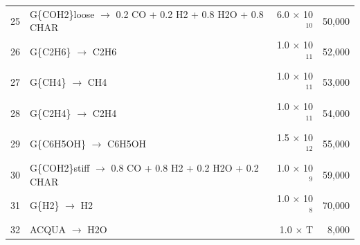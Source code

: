 \documentclass[12pt,titlepage]{article}
\begin{document}
\begin{center}
\begin{longtable}{cp{4in}rr}
    25 & G\{COH2\}loose $\rightarrow$ 0.2 CO + 0.2 H2 + 0.8 H2O + 0.8 CHAR & 6.0 $\times$ 10$^{10}$ & 50,000 \\
    26 & G\{C2H6\} $\rightarrow$ C2H6 & 1.0 $\times$ 10$^{11}$ & 52,000 \\
    27 & G\{CH4\} $\rightarrow$ CH4 & 1.0 $\times$ 10$^{11}$ & 53,000 \\
    28 & G\{C2H4\} $\rightarrow$ C2H4 & 1.0 $\times$ 10$^{11}$ & 54,000 \\
    29 & G\{C6H5OH\} $\rightarrow$ C6H5OH & 1.5 $\times$ 10$^{12}$ & 55,000 \\
    30 & G\{COH2\}stiff $\rightarrow$ 0.8 CO + 0.8 H2 + 0.2 H2O + 0.2 CHAR & 1.0 $\times$ 10$^9$ & 59,000 \\
    31 & G\{H2\} $\rightarrow$ H2 & 1.0 $\times$ 10$^8$ & 70,000 \\
    32 & ACQUA $\rightarrow$ H2O & 1.0 $\times$ T & 8,000 \\
    \bottomrule
\end{longtable}
\end{center}
\end{document}
